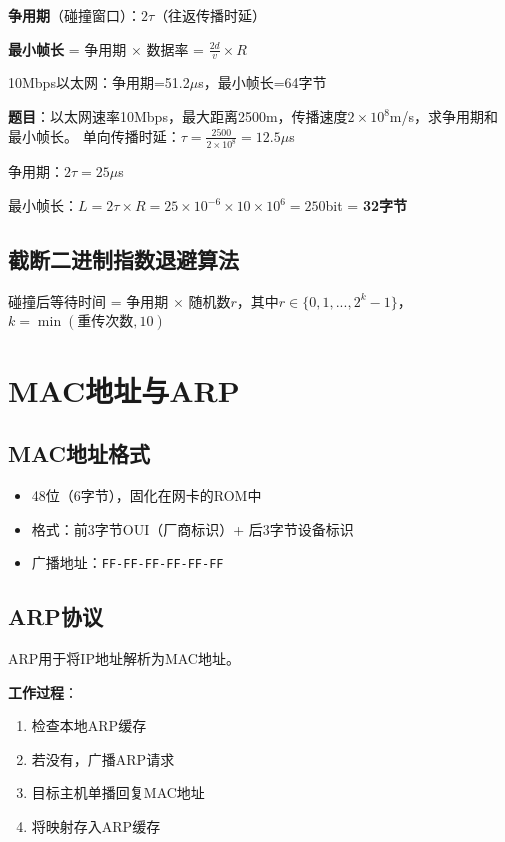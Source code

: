 \begin{formulabox}
\textbf{争用期}（碰撞窗口）：$2\tau$（往返传播时延）

\textbf{最小帧长} = 争用期 $\times$ 数据率 = $\frac{2d}{v} \times R$

10Mbps以太网：争用期=51.2$\mu$s，最小帧长=64字节
\end{formulabox}

\begin{examplebox}
\textbf{题目}：以太网速率10Mbps，最大距离2500m，传播速度$2\times10^8$m/s，求争用期和最小帧长。
\tcblower
单向传播时延：$\tau = \frac{2500}{2\times10^8} = 12.5\mu$s

争用期：$2\tau = 25\mu$s

最小帧长：$L = 2\tau \times R = 25\times10^{-6} \times 10\times10^6 = 250$bit = \textbf{32字节}
\end{examplebox}

\subsection{截断二进制指数退避算法}
碰撞后等待时间 = 争用期 $\times$ 随机数$r$，其中$r \in \{0,1,...,2^k-1\}$，$k=\min(\text{重传次数},10)$

\section{MAC地址与ARP}
\subsection{MAC地址格式}
\begin{itemize}[leftmargin=2em,itemsep=0pt]
    \item 48位（6字节），固化在网卡的ROM中
    \item 格式：前3字节OUI（厂商标识）+ 后3字节设备标识
    \item 广播地址：\texttt{FF-FF-FF-FF-FF-FF}
\end{itemize}

\subsection{ARP协议}
ARP用于将IP地址解析为MAC地址。

\textbf{工作过程}：
\begin{enumerate}[leftmargin=2em,itemsep=0pt]
    \item 检查本地ARP缓存
    \item 若没有，广播ARP请求
    \item 目标主机单播回复MAC地址
    \item 将映射存入ARP缓存
\end{enumerate}

